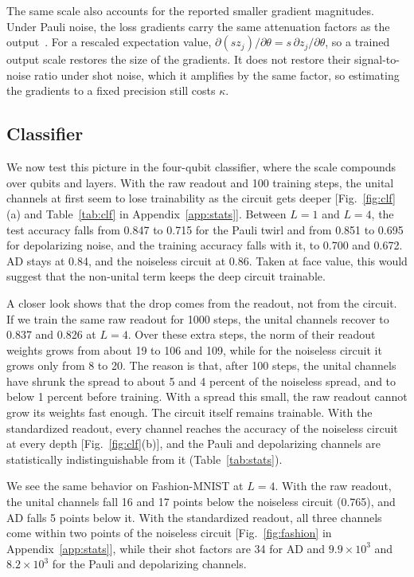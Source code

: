 \documentclass[
 aps,pra,
 twocolumn,
 superscriptaddress,
 longbibliography,
 nofootinbib
]{revtex4-2}
\begin{document}
The same scale also accounts for the reported smaller gradient magnitudes.
Under Pauli noise, the loss gradients carry the same attenuation factors as the
output~\cite{vanrossum2026biased}. For a rescaled expectation value,
$\partial(s z_j)/\partial\theta=s\,\partial z_j/\partial\theta$, so a trained
output scale restores the size of the gradients. It does not restore their
signal-to-noise ratio under shot noise, which it amplifies by the same factor,
so estimating the gradients to a fixed precision still costs $\kappa$.

\subsection{Classifier}
\label{sec:clf}

We now test this picture in the four-qubit classifier, where the scale
compounds over qubits and layers. With the raw readout and 100 training steps, the unital channels at
first seem to lose trainability as the circuit gets deeper
[Fig.~\ref{fig:clf}(a) and Table~\ref{tab:clf} in Appendix~\ref{app:stats}]. Between $L=1$ and $L=4$, the test
accuracy falls from 0.847 to 0.715 for the Pauli twirl and from 0.851 to 0.695
for depolarizing noise, and the training accuracy falls with it, to 0.700 and
0.672. AD stays at 0.84, and the noiseless circuit at 0.86. Taken at face
value, this would suggest that the non-unital term keeps the deep circuit
trainable.

A closer look shows that the drop comes from the readout, not from the
circuit. If we train the same raw readout for 1000 steps, the unital channels
recover to 0.837 and 0.826 at $L=4$. Over these extra steps, the norm of their
readout weights grows from about 19 to 106 and 109, while for the noiseless
circuit it grows only from 8 to 20. The reason is that, after 100 steps, the
unital channels have shrunk the spread to about 5 and 4 percent of the
noiseless spread, and to below 1 percent before training. With a spread this
small, the raw readout cannot grow its weights fast enough. The circuit itself
remains trainable. With the standardized readout, every channel reaches the
accuracy of the noiseless circuit at every depth [Fig.~\ref{fig:clf}(b)], and
the Pauli and depolarizing channels are statistically indistinguishable from it
(Table~\ref{tab:stats}).

We see the same behavior on Fashion-MNIST at $L=4$. With the raw readout, the
unital channels fall 16 and 17 points below the noiseless circuit (0.765), and
AD falls 5 points below it. With the standardized readout, all three channels
come within two points of the noiseless circuit [Fig.~\ref{fig:fashion} in
Appendix~\ref{app:stats}],
while their shot factors are 34 for AD and $9.9\times10^3$ and
$8.2\times10^3$ for the Pauli and depolarizing channels.
\end{document}
